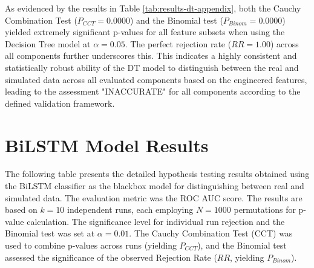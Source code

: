 \begin{appendices}
  As evidenced by the results in Table \ref{tab:results-dt-appendix}, both the Cauchy Combination Test ($P_{CCT}=0.0000$) and the Binomial test ($P_{Binom}=0.0000$) yielded extremely significant p-values for all feature subsets when using the Decision Tree model at $\alpha=0.05$. The perfect rejection rate ($RR=1.00$) across all components further underscores this. This indicates a highly consistent and statistically robust ability of the DT model to distinguish between the real and simulated data across all evaluated components based on the engineered features, leading to the assessment "INACCURATE" for all components according to the defined validation framework.

  \section{BiLSTM Model Results}
  \label{sec:lstm_results_appendix} %

  The following table presents the detailed hypothesis testing results obtained using the BiLSTM classifier as the blackbox model for distinguishing between real and simulated data. The evaluation metric was the ROC AUC score. The results are based on $k=10$ independent runs, each employing $N=1000$ permutations for p-value calculation. The significance level for individual run rejection and the Binomial test was set at $\alpha=0.01$. The Cauchy Combination Test (CCT) was used to combine p-values across runs (yielding $P_{CCT}$), and the Binomial test assessed the significance of the observed Rejection Rate ($RR$, yielding $P_{Binom}$).


\end{appendices}

